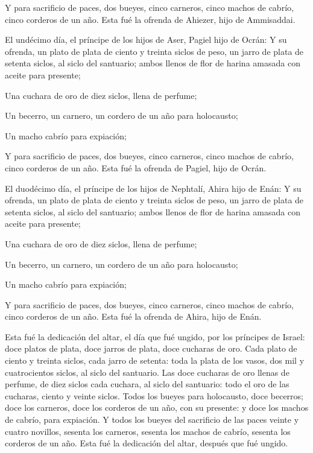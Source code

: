  Y para sacrificio de paces, dos bueyes, cinco carneros,
cinco machos de cabrío, cinco corderos de un año. Esta fué la ofrenda de
Ahiezer, hijo de Ammisaddai.

 El undécimo día, el príncipe de los hijos de Aser, Pagiel
hijo de Ocrán:  Y su ofrenda, un plato de plata de ciento y
treinta siclos de peso, un jarro de plata de setenta siclos, al siclo
del santuario; ambos llenos de flor de harina amasada con aceite para
presente;

 Una cuchara de oro de diez siclos, llena de perfume;

 Un becerro, un carnero, un cordero de un año para
holocausto;

 Un macho cabrío para expiación;

 Y para sacrificio de paces, dos bueyes, cinco carneros,
cinco machos de cabrío, cinco corderos de un año. Esta fué la ofrenda de
Pagiel, hijo de Ocrán.

 El duodécimo día, el príncipe de los hijos de Nephtalí,
Ahira hijo de Enán:  Y su ofrenda, un plato de plata de
ciento y treinta siclos de peso, un jarro de plata de setenta siclos, al
siclo del santuario; ambos llenos de flor de harina amasada con aceite
para presente;

 Una cuchara de oro de diez siclos, llena de perfume;

 Un becerro, un carnero, un cordero de un año para
holocausto;

 Un macho cabrío para expiación;

 Y para sacrificio de paces, dos bueyes, cinco carneros,
cinco machos de cabrío, cinco corderos de un año. Esta fué la ofrenda de
Ahira, hijo de Enán.

 Esta fué la dedicación del altar, el día que fué ungido,
por los príncipes de Israel: doce platos de plata, doce jarros de plata,
doce cucharas de oro.  Cada plato de ciento y treinta
siclos, cada jarro de setenta: toda la plata de los vasos, dos mil y
cuatrocientos siclos, al siclo del santuario.  Las doce
cucharas de oro llenas de perfume, de diez siclos cada cuchara, al siclo
del santuario: todo el oro de las cucharas, ciento y veinte siclos.
 Todos los bueyes para holocausto, doce becerros; doce los
carneros, doce los corderos de un año, con su presente: y doce los
machos de cabrío, para expiación.  Y todos los bueyes del
sacrificio de las paces veinte y cuatro novillos, sesenta los carneros,
sesenta los machos de cabrío, sesenta los corderos de un año. Esta fué
la dedicación del altar, después que fué ungido.

